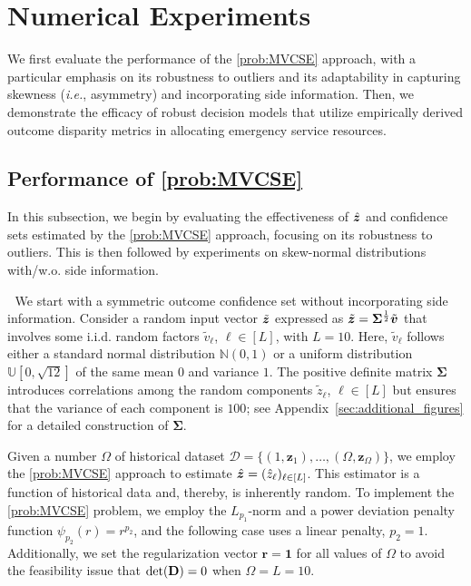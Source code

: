 \documentclass[opre, nonblindrev]{informswp}
\newcommand{\1}[1]{\mathds{1}{\left(#1\right)}}
\begin{document}
\section{Numerical Experiments}
\label{sec:case_study}
We first evaluate the performance of the \ref{prob:MVCSE} approach, 
with a particular emphasis on its robustness to outliers and its adaptability in capturing skewness (\textit{i.e.}, asymmetry) and incorporating side information. Then, we demonstrate the efficacy of robust decision models that utilize empirically derived outcome disparity metrics in allocating emergency service resources.

\subsection*{Performance of \ref{prob:MVCSE}}
In this subsection, we begin by evaluating the effectiveness of $\hat{\bm{z}}$ and confidence sets estimated by the \ref{prob:MVCSE} approach, focusing on its robustness to outliers. This is then followed by experiments on skew-normal distributions with/w.o. side information.

\medskip
{} $\;$
We start with a symmetric outcome confidence set without incorporating side information. Consider a random input vector $\tilde{\bm{z}}$ expressed as $\tilde{\bm{z}} = {\mathbf{\Sigma}}^{\frac{1}{2}} \tilde{\bm{v}}$ that involves some i.i.d. random factors $\tilde v_\ell$, $\ell \in [L]$, with $L = 10$. Here, $\tilde v_\ell$ follows either a standard normal distribution $\mathbb{N}(0,1)$ or a uniform distribution $\mathbb{U}[0,\sqrt{12}]$ of the same mean $0$ and variance $1$. The positive definite matrix $\bm \Sigma$ introduces correlations among the random components $\tilde z_\ell$, $\ell \in [L]$ but ensures that the variance of each component is $100$; see Appendix~\ref{sec:additional_figures} for a detailed construction of $\bm \Sigma$. 

Given a number $\Omega$ of historical dataset $\mathcal{D} = \{(1,\bm z_1), \dots, (\Omega,\bm z_\Omega)\}$, we employ the \ref{prob:MVCSE} approach to estimate $\hat{\bm{z}} = (\hat z_\ell)_{\ell \in [L]}$. This estimator is a function of historical data and, thereby, is inherently random. To implement the \ref{prob:MVCSE} problem, we employ the $L_{p_1}$-norm and a power deviation penalty function $\psi_{p_2}(r) = r^{p_2}$, and the following case uses a linear penalty, \ie $p_2 =1$. Additionally, we set the regularization vector $\bm r = \bm 1$ for all values of $\Omega$ to avoid the feasibility issue that $\det({\mathbf{D}}) = 0$ when $\Omega = L = 10$.
\end{document}
